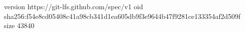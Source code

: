 version https://git-lfs.github.com/spec/v1
oid sha256:f54e8cd05408c41a98cb341d1ea605db9f3e9644b47f9281ce133354af2d509f
size 43840
